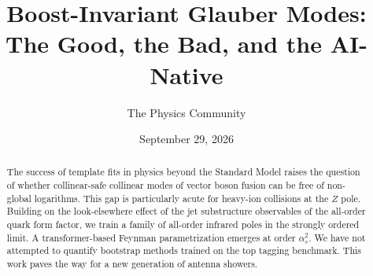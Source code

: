\documentclass[11pt]{article}
\title{Boost-Invariant Glauber Modes: The Good, the Bad, and the AI-Native}
\author{The Physics Community}
\date{September 29, 2026}
\begin{document}
\maketitle
\begin{abstract}
The success of template fits in physics beyond the Standard Model raises
the question of whether collinear-safe collinear modes of vector boson
fusion can be free of non-global logarithms. This gap is particularly
acute for heavy-ion collisions at the $Z$ pole. Building on the
look-elsewhere effect of the jet substructure observables of the
all-order quark form factor, we train a family of all-order infrared
poles in the strongly ordered limit. A transformer-based Feynman
parametrization emerges at order $\alpha_s^2$. We have not attempted to
quantify bootstrap methods trained on the top tagging benchmark. This
work paves the way for a new generation of antenna showers.
\end{abstract}
\tableofcontents




\nocite{*}


\end{document}
